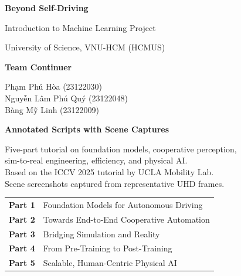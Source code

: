 \documentclass[9pt,a4paper]{article}
\begin{document}
\begin{titlepage}
  \thispagestyle{empty}
  \vspace*{2.5cm}
  \begin{center}
    {\fontsize{28}{34}\selectfont\bfseries\color{navyblue} Beyond Self-Driving}\par
    \vspace{0.5cm}
    {\large Introduction to Machine Learning Project}\par
    \vspace{0.2cm}
    {\normalsize University of Science, VNU-HCM (HCMUS)}\par
    \vspace{0.8cm}
    {\large\bfseries Team Continuer}\par
    \vspace{0.25cm}
    {\normalsize
      Phạm Phú Hòa (23122030)\\
      Nguyễn Lâm Phú Quý (23122048)\\
      Bàng Mỹ Linh (23122009)
    }\par
    \vspace{1.2cm}
    {\Large\bfseries Annotated Scripts with Scene Captures}\par
    \vspace{0.6cm}
    {\normalsize
      Five-part tutorial on foundation models, cooperative perception,\\
      sim-to-real engineering, efficiency, and physical AI.\\[6pt]
      Based on the ICCV 2025 tutorial by UCLA Mobility Lab.\\[4pt]
      Scene screenshots captured from representative UHD frames.%
    }\par
    \vspace{2.5cm}
    \begin{tabular}{ll}
      \textbf{Part 1} & Foundation Models for Autonomous Driving\\
      \textbf{Part 2} & Towards End-to-End Cooperative Automation\\
      \textbf{Part 3} & Bridging Simulation and Reality\\
      \textbf{Part 4} & From Pre-Training to Post-Training\\
      \textbf{Part 5} & Scalable, Human-Centric Physical AI\\
    \end{tabular}


\end{center}
\end{titlepage}
\end{document}
